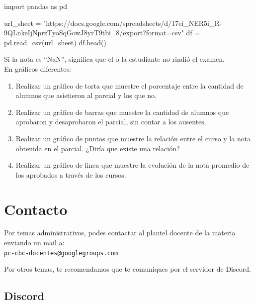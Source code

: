\documentclass[
  letterpaper,
  DIV=11,
  numbers=noendperiod]{scrreprt}
\newenvironment{Shaded}{\begin{snugshade}}{\end{snugshade}}
\newcommand{\ImportTok}[1]{\textcolor[rgb]{0.00,0.46,0.62}{#1}}
\newcommand{\NormalTok}[1]{\textcolor[rgb]{0.00,0.23,0.31}{#1}}
\newcommand{\OperatorTok}[1]{\textcolor[rgb]{0.37,0.37,0.37}{#1}}
\newcommand{\StringTok}[1]{\textcolor[rgb]{0.13,0.47,0.30}{#1}}
\providecommand{\tightlist}{%
  \setlength{\itemsep}{0pt}\setlength{\parskip}{0pt}}\usepackage{longtable,booktabs,array}
\begin{document}
\begin{enumerate}
\begin{Shaded}
\begin{Highlighting}[]
\ImportTok{import}\NormalTok{ pandas }\ImportTok{as}\NormalTok{ pd}

\NormalTok{url\_sheet }\OperatorTok{=} \StringTok{"https://docs.google.com/spreadsheets/d/17ei\_NER5i\_R{-}9QLnkeIjNprzTyoSqGowJ8yrT9tbi\_8/export?format=csv"}
\NormalTok{df }\OperatorTok{=}\NormalTok{ pd.read\_csv(url\_sheet)}
\NormalTok{df.head()}
\end{Highlighting}
\end{Shaded}

  Si la nota es ``NaN'', significa que el o la estudiante no rindió el
  examen.\\
  En gráficos diferentes:

  \begin{enumerate}
  \def\labelenumii{\alph{enumii}.}
  \tightlist
  \item
    Realizar un gráfico de torta que muestre el porcentaje entre la
    cantidad de alumnos que asistieron al parcial y los que no.
  \item
    Realizar un gráfico de barras que muestre la cantidad de alumnos que
    aprobaron y desaprobaron el parcial, sin contar a los ausentes.
  \item
    Realizar un gráfico de puntos que muestre la relación entre el curso
    y la nota obtenida en el parcial. ¿Diría que existe una relación?
  \item
    Realizar un gráfico de linea que muestre la evolución de la nota
    promedio de los aprobados a través de los cursos.
  \end{enumerate}
\end{enumerate}


\chapter*{Contacto}\label{contacto}


Por temas administrativos, podes contactar al plantel docente de la
materia enviando un mail a:\\
\texttt{pc-cbc-docentes@googlegroups.com}

Por otros temas, te recomendamos que te comuniques por el servidor de
Discord.

\section*{Discord}\label{discord-1}
\end{document}
